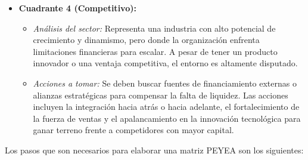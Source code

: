 \begin{itemize}
	\item \textbf{Cuadrante 4 (Competitivo):} 
	\begin{itemize}
		\item \textit{Análisis del sector:} Representa una industria con alto potencial de crecimiento y dinamismo, pero donde la organización enfrenta limitaciones financieras para escalar. A pesar de tener un producto innovador o una ventaja competitiva, el entorno es altamente disputado.
		\item \textit{Acciones a tomar:} Se deben buscar fuentes de financiamiento externas o alianzas estratégicas para compensar la falta de liquidez. Las acciones incluyen la integración hacia atrás o hacia adelante, el fortalecimiento de la fuerza de ventas y el apalancamiento en la innovación tecnológica para ganar terreno frente a competidores con mayor capital.
	\end{itemize}
\end{itemize}

Los pasos que son necesarios para elaborar una matriz PEYEA son los siguientes:


